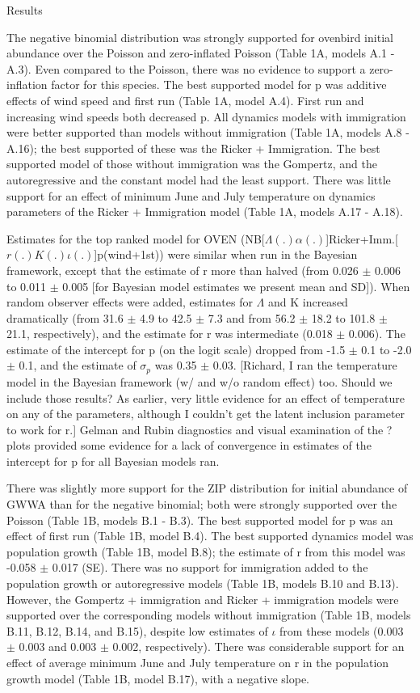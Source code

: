\documentclass[12pt]{article}
\begin{document}
Results

The negative binomial distribution was strongly supported for ovenbird
initial abundance over the Poisson and zero-inflated Poisson (Table
1A, models A.1 - A.3).  Even compared to the Poisson, there was no
evidence to support a zero-inflation factor for this species.  The
best supported model for p was additive effects of wind speed and
first run (Table 1A, model A.4).  First run and increasing wind speeds
both decreased p.  All dynamics models with immigration were better
supported than models without immigration (Table 1A, models A.8 -
A.16); the best supported of these was the Ricker + Immigration.  The
best supported model of those without immigration was the Gompertz,
and the autoregressive and the constant model had the least support.
There was little support for an effect of minimum June and July
temperature on dynamics parameters of the Ricker + Immigration model
(Table 1A, models A.17 - A.18).

Estimates for the top ranked model for OVEN
(NB[$\Lambda (.) \alpha (.)$]Ricker+Imm.[$r(.)K(.) \iota (.)$]p(wind+1st)) were similar when
run in the Bayesian framework, except that the estimate of r more than
halved (from 0.026 $\pm$ 0.006 to 0.011 $\pm$ 0.005 [for Bayesian model
estimates we present mean and SD]).  When random observer effects were
added, estimates for $\Lambda$ and K increased dramatically (from 31.6 $\pm$ 4.9
to 42.5 $\pm$ 7.3 and from 56.2 $\pm$ 18.2 to 101.8 $\pm$ 21.1, respectively), and
the estimate for r was intermediate (0.018 $\pm$ 0.006).  The estimate of
the intercept for p (on the logit scale) dropped from -1.5 $\pm$ 0.1 to
-2.0 $\pm$ 0.1, and the estimate of $\sigma_p$ was 0.35 $\pm$ 0.03.  [Richard, I ran
the temperature model in the Bayesian framework (w/ and w/o random
effect) too.  Should we include those results?  As earlier, very
little evidence for an effect of temperature on any of the parameters,
although I couldn't get the latent inclusion parameter to work for r.]
Gelman and Rubin diagnostics and visual examination of the ? plots
provided some evidence for a lack of convergence in estimates of the
intercept for p for all Bayesian models ran.

There was slightly more support for the ZIP distribution for initial
abundance of GWWA than for the negative binomial; both were strongly
supported over the Poisson (Table 1B, models B.1 - B.3).  The best
supported model for p was an effect of first run (Table 1B, model
B.4).  The best supported dynamics model was population growth (Table
1B, model B.8); the estimate of r from this model was -0.058 $\pm$ 0.017
(SE).  There was no support for immigration added to the population
growth or autoregressive models (Table 1B, models B.10 and B.13).
However, the Gompertz + immigration and Ricker + immigration models
were supported over the corresponding models without immigration
(Table 1B, models B.11, B.12, B.14, and B.15), despite low estimates
of $\iota$ from these models (0.003 $\pm$ 0.003 and 0.003 $\pm$ 0.002,
respectively).  There was considerable support for an effect of
average minimum June and July temperature on r in the population
growth model (Table 1B, model B.17), with a negative slope.
\end{document}
